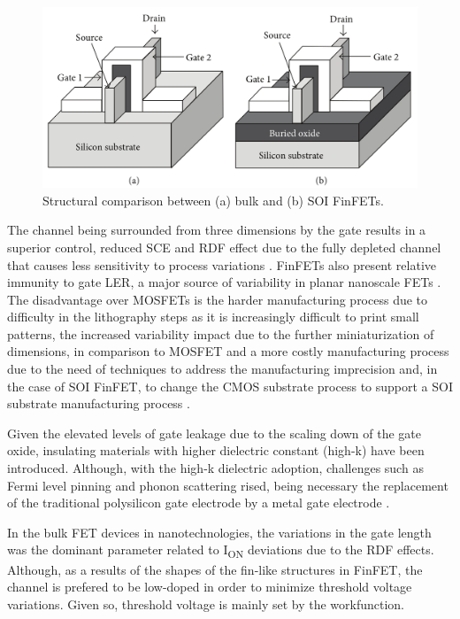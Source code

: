 \documentclass[pgmicro,mestrado,english]{iiufrgs}
\begin{document}
    \begin{figure} [H]
        \centering
        \includegraphics[width=\textwidth, trim={0 0 0 0},clip]{finfet2.png}
        \caption{Structural comparison between (a) bulk and (b) SOI FinFETs.}
        \label{bulkvssoi}
    \end{figure}

The channel being surrounded from three dimensions by the gate results in a superior control, reduced SCE and RDF effect due to the fully depleted channel that causes less sensitivity to process variations \cite{taur2013fundamentals}. FinFETs also present relative immunity to gate LER, a major source of variability in planar nanoscale FETs \cite{finfetchar1}. The disadvantage over MOSFETs is the harder manufacturing process due to difficulty in the lithography steps as it is increasingly difficult to print small patterns, the increased variability impact due to the further miniaturization of dimensions, in comparison to MOSFET and a more costly manufacturing process due to the need of techniques to address the manufacturing imprecision and, in the case of SOI FinFET, to change the CMOS substrate process to support a SOI substrate manufacturing process \cite{finfetchar1} \cite{finfetdis}.

Given the elevated levels of gate leakage due to the scaling down of the gate oxide, insulating materials with higher dielectric constant (high-k) have been introduced. Although, with the high-k dielectric adoption, challenges such as Fermi level pinning \cite{hobbs2004fermi} and phonon scattering \cite{gusev2006advanced} rised, being necessary the replacement of the traditional polysilicon gate electrode by a metal gate electrode \cite{gusev2001ultrathin, datta2003high}.

In the bulk FET devices in nanotechnologies, the variations in the gate length was the dominant parameter related to I\textsubscript{ON} deviations due to the RDF effects. Although, as a results of the shapes of the fin-like structures in FinFET, the channel is prefered to be low-doped in order to minimize threshold voltage variations. Given so, threshold voltage is mainly set by the workfunction. 
\end{document}
